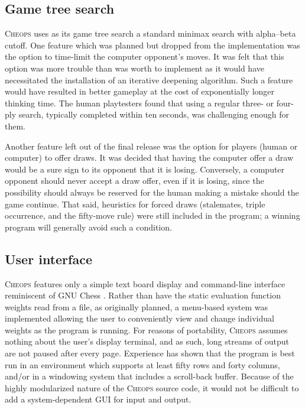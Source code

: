 \documentclass[a4paper]{article}
\begin{document}
\subsection{Game tree search}

\textsc{Cheops} uses as its game tree search a standard minimax search
with alpha--beta cutoff. One feature which was planned but dropped
from the implementation was the option to time-limit the computer
opponent's moves. It was felt that this option was more trouble than
was worth to implement as it would have necessitated the installation
of an iterative deepening algorithm. Such a feature would have
resulted in better gameplay at the cost of exponentially longer
thinking time. The human playtesters found that using a regular three-
or four-ply search, typically completed within ten seconds, was
challenging enough for them.

Another feature left out of the final release was the option for
players (human or computer) to offer draws. It was decided that having
the computer offer a draw would be a sure sign to its opponent that it
is losing. Conversely, a computer opponent should never accept a draw
offer, even if it is losing, since the possibility should always be
reserved for the human making a mistake should the game continue. That
said, heuristics for forced draws (stalemates, triple occurrence, and
the fifty-move rule) were still included in the program; a winning
program will generally avoid such a condition.

\subsection{User interface}

\textsc{Cheops} features only a simple text board display and
command-line interface reminiscent of GNU Chess \cite{gnuchess}.
Rather than have the static evaluation function weights read from a
file, as originally planned, a menu-based system was implemented
allowing the user to conveniently view and change individual weights
as the program is running. For reasons of portability, \textsc{Cheops}
assumes nothing about the user's display terminal, and as such, long
streams of output are not paused after every page. Experience has
shown that the program is best run in an environment which supports at
least fifty rows and forty columns, and/or in a windowing system that
includes a scroll-back buffer.  Because of the highly modularized
nature of the \textsc{Cheops} source code, it would not be difficult
to add a system-dependent GUI for input and output.
\end{document}
